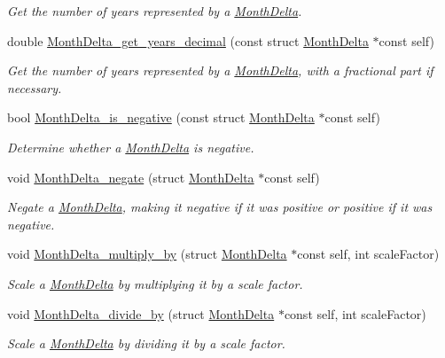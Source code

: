 \begin{DoxyCompactItemize}
\begin{DoxyCompactList}\small\item\em \-Get the number of years represented by a \hyperlink{structMonthDelta}{\-Month\-Delta}. \end{DoxyCompactList}\item 
double \hyperlink{month-delta_8h_afa5436ebc73fc5ce02c99f86a05d377c}{\-Month\-Delta\-\_\-get\-\_\-years\-\_\-decimal} (const struct \hyperlink{structMonthDelta}{\-Month\-Delta} $\ast$const self)
\begin{DoxyCompactList}\small\item\em \-Get the number of years represented by a \hyperlink{structMonthDelta}{\-Month\-Delta}, with a fractional part if necessary. \end{DoxyCompactList}\item 
bool \hyperlink{month-delta_8h_a03c4b1b8f6edca4c798b469e3f03bdfa}{\-Month\-Delta\-\_\-is\-\_\-negative} (const struct \hyperlink{structMonthDelta}{\-Month\-Delta} $\ast$const self)
\begin{DoxyCompactList}\small\item\em \-Determine whether a \hyperlink{structMonthDelta}{\-Month\-Delta} is negative. \end{DoxyCompactList}\item 
void \hyperlink{month-delta_8h_a4d77c910d4ec5841e5e3f59d63490078}{\-Month\-Delta\-\_\-negate} (struct \hyperlink{structMonthDelta}{\-Month\-Delta} $\ast$const self)
\begin{DoxyCompactList}\small\item\em \-Negate a \hyperlink{structMonthDelta}{\-Month\-Delta}, making it negative if it was positive or positive if it was negative. \end{DoxyCompactList}\item 
void \hyperlink{month-delta_8h_a147987d17fd1c580240979fde395b723}{\-Month\-Delta\-\_\-multiply\-\_\-by} (struct \hyperlink{structMonthDelta}{\-Month\-Delta} $\ast$const self, int scale\-Factor)
\begin{DoxyCompactList}\small\item\em \-Scale a \hyperlink{structMonthDelta}{\-Month\-Delta} by multiplying it by a scale factor. \end{DoxyCompactList}\item 
void \hyperlink{month-delta_8h_acd94c6f51a37b55c6e6b6ebd5a39cf7e}{\-Month\-Delta\-\_\-divide\-\_\-by} (struct \hyperlink{structMonthDelta}{\-Month\-Delta} $\ast$const self, int scale\-Factor)
\begin{DoxyCompactList}\small\item\em \-Scale a \hyperlink{structMonthDelta}{\-Month\-Delta} by dividing it by a scale factor. \end{DoxyCompactList}\item 

\end{DoxyCompactItemize}
